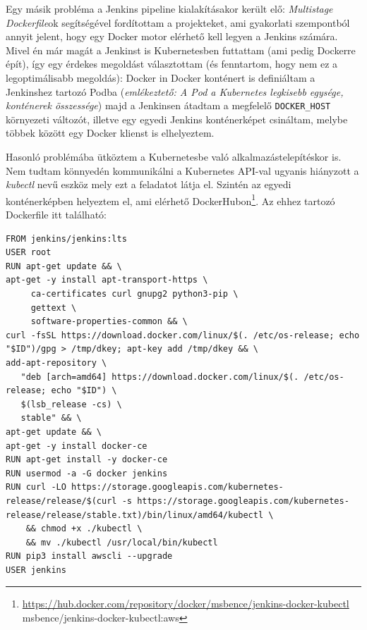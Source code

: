 Egy másik probléma a Jenkins pipeline kialakításakor került elő: \textit{Multistage Dockerfile}ok segítségével fordítottam a projekteket, ami gyakorlati szempontból annyit jelent, hogy egy Docker motor elérhető kell legyen a Jenkins számára. Mivel én már magát a Jenkinst is Kubernetesben futtattam (ami pedig Dockerre épít), így egy érdekes megoldást választottam (és fenntartom, hogy nem ez a legoptimálisabb megoldás): Docker in Docker konténert is definiáltam a Jenkinshez tartozó Podba (\textit{emlékeztető: A Pod a Kubernetes legkisebb egysége, konténerek összessége}) majd a Jenkinsen átadtam a megfelelő \lstinline{DOCKER_HOST} környezeti változót, illetve egy egyedi Jenkins konténerképet csináltam, melybe többek között egy Docker klienst is elhelyeztem.

Hasonló problémába ütköztem a Kubernetesbe való alkalmazástelepítéskor is. Nem tudtam könnyedén kommunikálni a Kubernetes API-val ugyanis hiányzott a \textit{kubectl} nevű eszköz mely ezt a feladatot látja el. Szintén az egyedi konténerképben helyeztem el, ami elérhető DockerHubon\footnote{\url{https://hub.docker.com/repository/docker/msbence/jenkins-docker-kubectl} \newline msbence/jenkins-docker-kubectl:aws}. Az ehhez tartozó Dockerfile itt található:
\begin{lstlisting}
FROM jenkins/jenkins:lts
USER root
RUN apt-get update && \
apt-get -y install apt-transport-https \
     ca-certificates curl gnupg2 python3-pip \
     gettext \
     software-properties-common && \
curl -fsSL https://download.docker.com/linux/$(. /etc/os-release; echo "$ID")/gpg > /tmp/dkey; apt-key add /tmp/dkey && \
add-apt-repository \
   "deb [arch=amd64] https://download.docker.com/linux/$(. /etc/os-release; echo "$ID") \
   $(lsb_release -cs) \
   stable" && \
apt-get update && \
apt-get -y install docker-ce
RUN apt-get install -y docker-ce
RUN usermod -a -G docker jenkins
RUN curl -LO https://storage.googleapis.com/kubernetes-release/release/$(curl -s https://storage.googleapis.com/kubernetes-release/release/stable.txt)/bin/linux/amd64/kubectl \
    && chmod +x ./kubectl \
    && mv ./kubectl /usr/local/bin/kubectl
RUN pip3 install awscli --upgrade
USER jenkins
\end{lstlisting}

